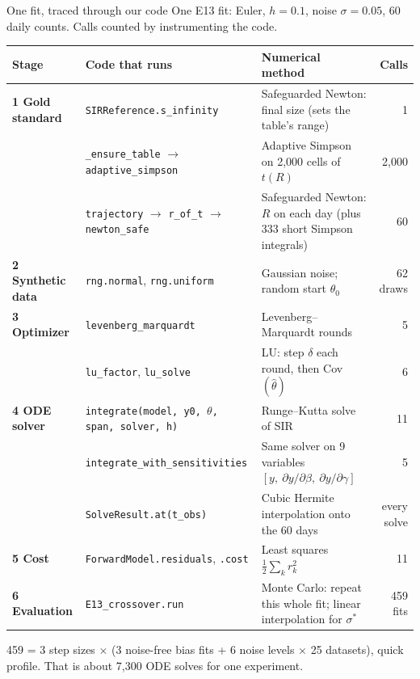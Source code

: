 \documentclass[aspectratio=169,11pt]{beamer}
\begin{document}
\begin{frame}[shrink=4]{One fit, traced through our code}
  {\small One E13 fit: Euler, $h=0.1$, noise $\sigma=0.05$, 60 daily counts. Calls counted by instrumenting the code.}

  \vspace{0.4em}
  \scriptsize
  \begin{tabular}{@{}p{2.25cm}p{5.0cm}p{5.0cm}r@{}}
    \toprule
    Stage & Code that runs & Numerical method & Calls\\
    \midrule
    \textbf{1 Gold standard} & \texttt{SIRReference.s\_infinity} & Safeguarded Newton: final size (sets the table's range) & 1\\
     & \texttt{\_ensure\_table} $\to$ \texttt{adaptive\_simpson} & Adaptive Simpson on 2{,}000 cells of $t(R)$ & 2{,}000\\
     & \texttt{trajectory} $\to$ \texttt{r\_of\_t} $\to$ \texttt{newton\_safe} & Safeguarded Newton: $R$ on each day (plus 333 short Simpson integrals) & 60\\
    \textbf{2 Synthetic data} & \texttt{rng.normal}, \texttt{rng.uniform} & Gaussian noise; random start $\theta_0$ & 62 draws\\
    \textbf{3 Optimizer} & \texttt{levenberg\_marquardt} & Levenberg--Marquardt rounds & 5\\
     & \texttt{lu\_factor}, \texttt{lu\_solve} & LU: step $\delta$ each round, then Cov$(\hat\theta)$ & 6\\
    \textbf{4 ODE solver} & \texttt{integrate(model, y0, $\theta$, span, solver, h)} & Runge--Kutta solve of SIR & 11\\
     & \texttt{integrate\_with\_sensitivities} & Same solver on 9 variables $[y,\ \partial y/\partial\beta,\ \partial y/\partial\gamma]$ & 5\\
     & \texttt{SolveResult.at(t\_obs)} & Cubic Hermite interpolation onto the 60 days & every solve\\
    \textbf{5 Cost} & \texttt{ForwardModel.residuals}, \texttt{.cost} & Least squares $\tfrac12\sum_k r_k^2$ & 11\\
    \textbf{6 Evaluation} & \texttt{E13\_crossover.run} & Monte Carlo: repeat this whole fit; linear interpolation for $\sigma^*$ & 459 fits\\
    \bottomrule
  \end{tabular}

  \vspace{0.5em}
  {\scriptsize\color{muted} 459 = 3 step sizes $\times$ (3 noise-free bias fits + 6 noise levels $\times$ 25 datasets), quick profile. That is about 7{,}300 ODE solves for one experiment.}
\end{frame}
\end{document}
